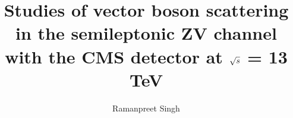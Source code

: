 \documentclass[12pt]{niuthesis}
\begin{document}



\title{Studies of vector boson scattering in the semileptonic ZV channel with the CMS detector at \( \sqrt{\MakeLowercase{s}} \) = 13 TeV}

\author{Ramanpreet Singh}


\begin{abstract}
  
\end{abstract}

\begin{acknowledgments}
  
\end{acknowledgments}

\begin{dedication}
  
\end{dedication}

\MakeThesisPrologue{}

\glsresetall{}








\printbibliography[heading=bibintoc, title={References}]

\appendix


\end{document}
